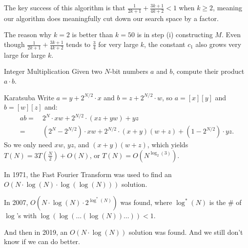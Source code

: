 \begin{remark}
    The key success of this algorithm is that $\frac{1}{2k + 1} + \frac{3k + 1}{4k + 2} < 1$ when $k \geq 2$, meaning our algorithm does meaningfully cut down our search space by a factor.

    The reason why $k = 2$ is better than $k = 50$ is in step (i) constructing $M$.  Even though $\frac{1}{2k + 1} + \frac{3k + 1}{4k + 2}$ tends to $\frac{3}{4}$ for very large $k$, the constant $c_1$ also grows very large for large $k$.
\end{remark}

\begin{problem}{Integer Multiplication}
    Given two $N$-bit numbers $a$ and $b$, compute their product $a \cdot b$.
\end{problem}

\begin{solution}{Karatsuba}
    Write $a = y + 2^{N/2} \cdot x$ and $b = z + 2^{N/2} \cdot w$, so $a = [x] [y]$ and $b = [w] [z]$ and:
    \begin{align*}
        ab = \ & 2^N \cdot xw + 2^{N / 2} \cdot (xz + yw) + yz \\
        = \ & (2^N - 2^{N / 2}) \cdot xw + 2^{N / 2} \cdot (x + y)(w + z) + (1 - 2^{N / 2}) \cdot yz.
    \end{align*}
    So we only need $xw$, $yz$, and $(x + y)(w + z)$, which yields $T(N) = 3T\left(\frac{N}{2}\right) + O(N)$, or $T(N) = O(N^{\log_2(3)})$.
\end{solution}

In 1971, the Fast Fourier Transform was used to find an $O(N \cdot \log(N) \cdot \log(\log(N)))$ solution.

In 2007, $O(N \cdot \log(N) \cdot 2^{\log^*(N)})$ was found, where $\log^*(N)$ is the \# of $\log$'s with $\log(\log(\dots(\log(N))\dots)) < 1$.

And then in 2019, an $O(N \cdot \log(N))$ solution was found.  And we still don't know if we can do better.

